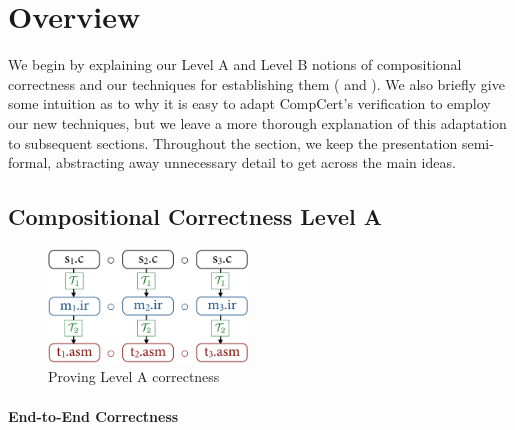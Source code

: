 \section{Overview}
\label{sec:sepcomp:overview}

We begin by explaining our Level A and Level B notions of compositional correctness and our
techniques for establishing them ( and ).  We
also briefly give some intuition as to why it is easy to adapt CompCert's verification to employ our
new techniques, but we leave a more thorough explanation of this adaptation to subsequent sections.
Throughout the section, we keep the presentation semi-formal, abstracting away unnecessary detail to
get across the main ideas.

\subsection{Compositional Correctness Level A}
\label{sec:overview:LevelA}

\begin{figure}[!t]
\begin{center}
\includegraphics[width=200px]{sepcomp-levela.png}
\end{center}
\caption{Proving Level A correctness}
\label{fig:LevelA}
\end{figure}


\paragraph{End-to-End Correctness}

